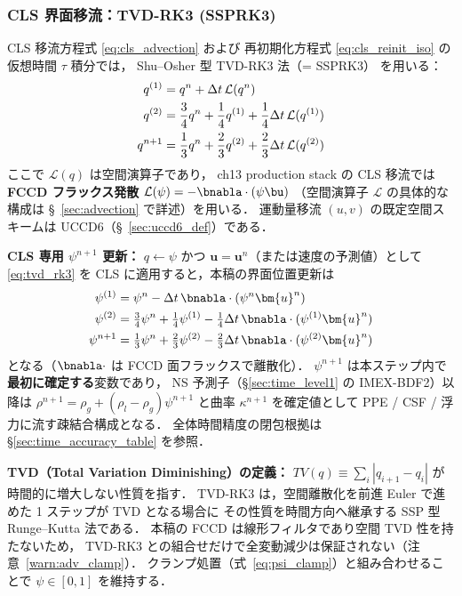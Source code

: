 \subsubsection*{CLS 界面移流：TVD-RK3 (SSPRK3)}

CLS 移流方程式 \eqref{eq:cls_advection} および
再初期化方程式 \eqref{eq:cls_reinit_iso} の仮想時間 $\tau$ 積分では，
Shu--Osher 型 TVD-RK3 法（= SSPRK3）\cite{ShuOsher1988} を用いる：
\begin{align}
  q^{(1)} &= q^n + \Delta t \, \mathcal{L}(q^n) \notag\\
  q^{(2)} &= \frac{3}{4}q^n + \frac{1}{4}q^{(1)} + \frac{1}{4}\Delta t\,\mathcal{L}(q^{(1)}) \notag\\
  q^{n+1} &= \frac{1}{3}q^n + \frac{2}{3}q^{(2)} + \frac{2}{3}\Delta t\,\mathcal{L}(q^{(2)})
  \label{eq:tvd_rk3}
\end{align}
ここで $\mathcal{L}(q)$ は空間演算子であり，
ch13 production stack の CLS 移流では \textbf{FCCD フラックス発散}
$\mathcal{L}(\psi)=-\bnabla\cdot(\psi\bu)$
（空間演算子 $\mathcal{L}$ の具体的な構成は §~\ref{sec:advection} で詳述）を用いる．
運動量移流 $(u,v)$ の既定空間スキームは UCCD6（§~\ref{sec:uccd6_def}）である．

\noindent\textbf{CLS 専用 $\psi^{n+1}$ 更新：}
$q \leftarrow \psi$ かつ $\bm{u}=\bm{u}^n$（または速度の予測値）として
\eqref{eq:tvd_rk3} を CLS に適用すると，本稿の界面位置更新は
\begin{align}
  \psi^{(1)} &= \psi^n - \Delta t\,\bnabla\cdot(\psi^n \bm{u}^n) \notag\\
  \psi^{(2)} &= \tfrac{3}{4}\psi^n + \tfrac{1}{4}\psi^{(1)}
               - \tfrac{1}{4}\Delta t\,\bnabla\cdot(\psi^{(1)}\bm{u}^n) \notag\\
  \psi^{n+1} &= \tfrac{1}{3}\psi^n + \tfrac{2}{3}\psi^{(2)}
               - \tfrac{2}{3}\Delta t\,\bnabla\cdot(\psi^{(2)}\bm{u}^n)
  \label{eq:cls_tvd_rk3_psi}
\end{align}
となる（$\bnabla\cdot$ は FCCD 面フラックスで離散化）．
$\psi^{n+1}$ は本ステップ内で\textbf{最初に確定する}変数であり，
NS 予測子（§\ref{sec:time_level1} の IMEX-BDF2）以降は
$\rho^{n+1} = \rho_g + (\rho_l - \rho_g)\psi^{n+1}$ と曲率 $\kappa^{n+1}$
を確定値として PPE / CSF / 浮力に流す疎結合構成となる．
全体時間精度の閉包根拠は §\ref{sec:time_accuracy_table} を参照．

\noindent\textbf{TVD（Total Variation Diminishing）の定義：}
$TV(q) \equiv \sum_i |q_{i+1} - q_i|$ が時間的に増大しない性質を指す．
TVD-RK3 は，空間離散化を前進 Euler で進めた 1 ステップが TVD となる場合に
その性質を時間方向へ継承する SSP 型 Runge--Kutta 法である．
本稿の FCCD は線形フィルタであり空間 TVD 性を持たないため，
TVD-RK3 との組合せだけで全変動減少は保証されない（注意~\ref{warn:adv_clamp}）．
クランプ処置（式~\eqref{eq:psi_clamp}）と組み合わせることで $\psi \in [0,1]$ を維持する．

